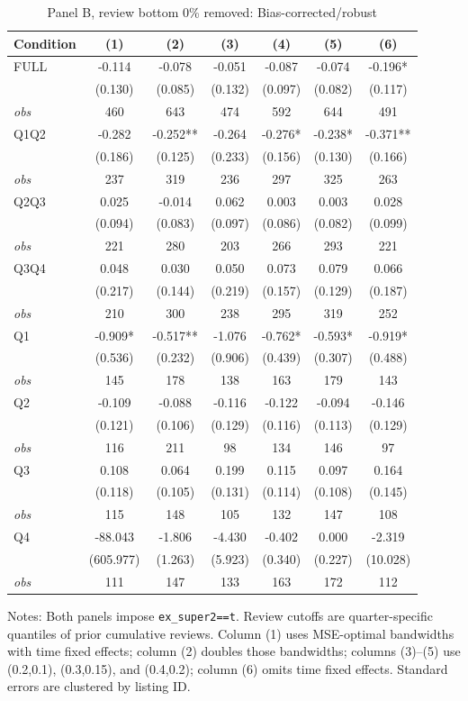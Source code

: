 \begin{table}[!htbp]
\centering
\caption{Panel B, review bottom 0\% removed: Bias-corrected/robust}
\begin{tabular}{lcccccc}
\toprule
Condition & (1) & (2) & (3) & (4) & (5) & (6) \\
\midrule
FULL & -0.114 & -0.078 & -0.051 & -0.087 & -0.074 & -0.196* \\
 & (0.130) & (0.085) & (0.132) & (0.097) & (0.082) & (0.117) \\
\textit{obs} & 460 & 643 & 474 & 592 & 644 & 491 \\
Q1Q2 & -0.282 & -0.252** & -0.264 & -0.276* & -0.238* & -0.371** \\
 & (0.186) & (0.125) & (0.233) & (0.156) & (0.130) & (0.166) \\
\textit{obs} & 237 & 319 & 236 & 297 & 325 & 263 \\
Q2Q3 & 0.025 & -0.014 & 0.062 & 0.003 & 0.003 & 0.028 \\
 & (0.094) & (0.083) & (0.097) & (0.086) & (0.082) & (0.099) \\
\textit{obs} & 221 & 280 & 203 & 266 & 293 & 221 \\
Q3Q4 & 0.048 & 0.030 & 0.050 & 0.073 & 0.079 & 0.066 \\
 & (0.217) & (0.144) & (0.219) & (0.157) & (0.129) & (0.187) \\
\textit{obs} & 210 & 300 & 238 & 295 & 319 & 252 \\
Q1 & -0.909* & -0.517** & -1.076 & -0.762* & -0.593* & -0.919* \\
 & (0.536) & (0.232) & (0.906) & (0.439) & (0.307) & (0.488) \\
\textit{obs} & 145 & 178 & 138 & 163 & 179 & 143 \\
Q2 & -0.109 & -0.088 & -0.116 & -0.122 & -0.094 & -0.146 \\
 & (0.121) & (0.106) & (0.129) & (0.116) & (0.113) & (0.129) \\
\textit{obs} & 116 & 211 & 98 & 134 & 146 & 97 \\
Q3 & 0.108 & 0.064 & 0.199 & 0.115 & 0.097 & 0.164 \\
 & (0.118) & (0.105) & (0.131) & (0.114) & (0.108) & (0.145) \\
\textit{obs} & 115 & 148 & 105 & 132 & 147 & 108 \\
Q4 & -88.043 & -1.806 & -4.430 & -0.402 & 0.000 & -2.319 \\
 & (605.977) & (1.263) & (5.923) & (0.340) & (0.227) & (10.028) \\
\textit{obs} & 111 & 147 & 133 & 163 & 172 & 112 \\
\bottomrule
\end{tabular}
\begin{minipage}{0.98\textwidth}\footnotesize
Notes: Both panels impose \texttt{ex\_super2==t}. Review cutoffs are quarter-specific quantiles of prior cumulative reviews. Column (1) uses MSE-optimal bandwidths with time fixed effects; column (2) doubles those bandwidths; columns (3)--(5) use (0.2,0.1), (0.3,0.15), and (0.4,0.2); column (6) omits time fixed effects. Standard errors are clustered by listing ID.
\end{minipage}
\end{table}

